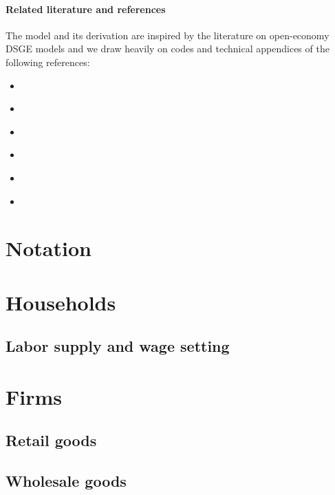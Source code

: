 \paragraph{Related literature and references}
The model and its derivation are inspired by the literature on open-economy DSGE models
  and we draw heavily on codes and technical appendices of the following references:
\begin{itemize}
\item \textcite{Cwik.Muller.Wolters_2011_DoesTradeIntegration}
\item \textcite{Eichenbaum.Johannsen.Rebelo_2021_MonetaryPolicyPredictability}
\item \textcite{Erceg.Guerrieri.Gust_2006_SIGMANewOpen}
\item \textcite{Georgiadis.Schumann_2021_DominantcurrencyPricingGlobal}
\item \textcite{Gomes.Jacquinot.Pisani_2012_EAGLEModelPolicy}
\item \textcite{Gopinath.Boz.Casas.EtAl_2020_DominantCurrencyParadigm}
\end{itemize}
\newpage

\section{Notation}

\newpage

\section{Households}


\subsection{Labor supply and wage setting\label{sec:LaborSupply}}


\section{Firms}

\subsection{Retail goods}


\subsection{Wholesale goods}
%


